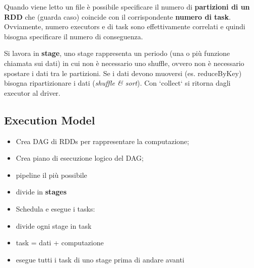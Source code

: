\documentclass[12pt,italian]{article}
\begin{document}
Quando viene letto un file è possibile specificare il numero di \textbf{partizioni di un RDD} che (guarda caso) coincide con il corrispondente \textbf{numero di task}.
Ovviamente, numero executors e di task sono effettivamente correlati e quindi bisogna specificare il numero di conseguenza.

Si lavora in \textbf{stage}, uno stage rappresenta un periodo (una o più funzione chiamata sui dati) in cui non è necessario uno shuffle, ovvero non è necessario spostare i dati tra le partizioni. Se i dati devono muoversi (es. reduceByKey) bisogna ripartizionare i dati (\textit{shuffle \& sort}).
Con `collect` si ritorna dagli executor al driver.


\subsection{Execution Model} %

\begin{itemize}
	\item Crea DAG di RDDs per rappresentare la computazione;
	\item Crea piano di esecuzione logico del DAG;
	\item pipeline il più possibile %
	\item divide in \textbf{stages}
	\item Schedula e esegue i tasks:
	\item divide ogni stage in task
	\item task = dati + computazione
	\item esegue tutti i task di uno stage prima di andare avanti
\end{itemize}
\end{document}
